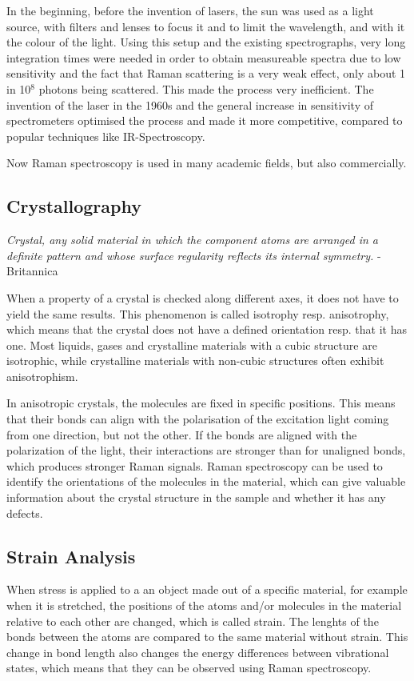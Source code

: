 \bigskip

In the beginning, before the invention of lasers, the sun was used as a light source, with filters and lenses to focus it and to limit the wavelength, and with it the colour of the light. Using this setup and the existing spectrographs, very long integration times were needed in order to obtain measureable  spectra due to low sensitivity and the fact that Raman scattering is a very weak effect, only about 1 in 10\(^8\) photons being scattered. This made the process very inefficient. The invention of the laser in the 1960s and the general increase in sensitivity of spectrometers optimised the process and made it more competitive, compared to popular techniques like IR-Spectroscopy.
\bigskip

Now Raman spectroscopy is used in many academic fields, but also commercially.

\newpage

\subsection{Crystallography}
\textit{Crystal, any solid material in which the component atoms are arranged in a definite pattern and whose surface regularity reflects its internal symmetry.} - Britannica \cite{brittanica}

\bigskip

When a property of a crystal is checked along different axes, it does not have to yield the same results. This phenomenon is called isotrophy resp. anisotrophy, which means that the crystal does not have a defined orientation resp. that it has one. Most liquids, gases and crystalline materials with a cubic structure are isotrophic, while crystalline materials with non-cubic structures often exhibit anisotrophism. 

\bigskip

In anisotropic crystals, the molecules are fixed in specific positions. This means that their bonds can align with the polarisation of the excitation light coming from one direction, but not the other. If the bonds are aligned with the polarization of the light, their interactions are stronger than for unaligned bonds, which produces stronger Raman signals. Raman spectroscopy can be used to identify the orientations of the molecules in the material, which can give valuable information about the crystal structure in the sample and whether it has any defects. 
\cite{RSAA}

\subsection{Strain Analysis}
When stress is applied to a an object made out of a specific material, for example when it is stretched, the positions of the atoms and/or molecules in the material relative to each other are changed, which is called strain. The lenghts of the bonds between the atoms are compared to the same material without strain. This change in bond length also changes the energy differences between vibrational states, which means that they can be observed using Raman spectroscopy.

